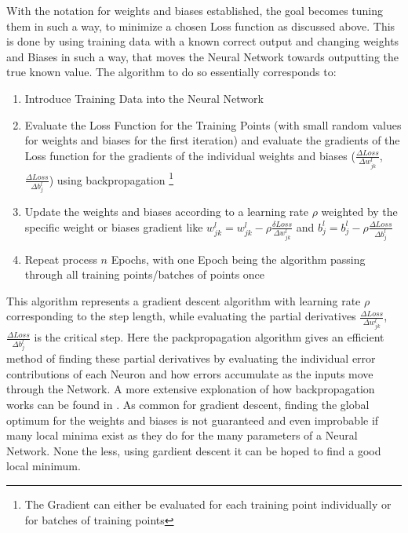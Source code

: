 With the notation for weights and biases established, the goal becomes tuning them in such a way, to minimize a chosen Loss function as discussed above. This is done by using training data with a known correct output and changing weights and Biases in such a way, that moves the Neural Network towards outputting the true known value. 
The algorithm to do so essentially corresponds to: 

\begin{enumerate}
	\item Introduce Training Data into the Neural Network
	\item Evaluate the Loss Function for the Training Points (with small random values for weights and biases for the first iteration) and evaluate the gradients of the Loss function for the gradients of the individual weights and biases ($\frac{\Delta Loss}{\Delta w_{jk}^l}$, $\frac{\Delta Loss}{\Delta b_j^l}$) using backpropagation  \footnote{The Gradient can either be evaluated for each training point individually or for batches of training points}
	\item Update the weights and biases according to a learning rate $\rho$ weighted by the specific weight or biases gradient like $w_{jk}^l =w_{jk}^l - \rho \frac{\delta Loss}{\Delta w_{jk}^l}$ and $b_j^l =b_j^l - \rho \frac{\Delta Loss}{\Delta b_j^l}$ 
	\item Repeat process $n$ Epochs, with one Epoch being the algorithm passing through all training points/batches of points once
\end{enumerate}

This algorithm represents a gradient descent algorithm with learning rate  $\rho$ corresponding to the step length, while evaluating the partial derivatives $\frac{\Delta Loss}{\Delta w_{jk}^l}$, $\frac{\Delta Loss}{\Delta b_j^l}$ is the critical step. Here the packpropagation algorithm gives an efficient method of finding these partial derivatives by evaluating the individual error contributions of each Neuron and how errors accumulate as the inputs move through the Network. A more extensive explonation of how backpropagation works can be found in \cite{nielsen2015neuralChap2}. As common for gradient descent, finding the global optimum for the weights and biases is not guaranteed and even improbable if many local minima exist as they do for the many parameters of a Neural Network. None the less, using gardient descent it can be hoped to find a good local minimum.   \cite{James2013} \cite{nielsen2015neuralChap2}

